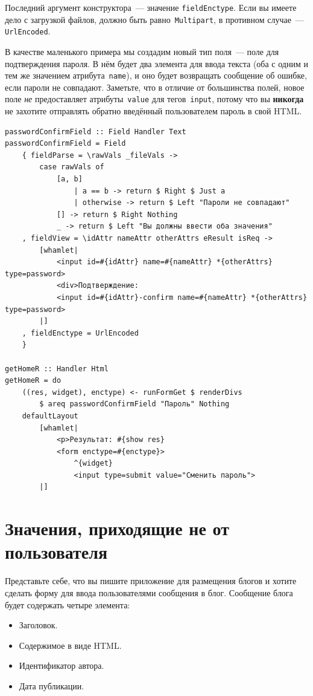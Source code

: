 Последний аргумент конструктора~--- значение \lstinline'fieldEnctype'. Если вы
имеете дело с загрузкой файлов, должно быть равно~\lstinline'Multipart', в
противном случае~--- \lstinline'UrlEncoded'.

В качестве маленького примера мы создадим новый тип поля~--- поле для
подтверждения пароля. В нём будет два элемента для ввода текста (оба с одним и
тем же значением атрибута~\texttt{name}), и оно будет возвращать сообщение об
ошибке, если пароли не совпадают. Заметьте, что в отличие от большинства
полей, новое поле \emph{не} предоставляет атрибуты~\texttt{value} для
тегов~\texttt{input}, потому что вы \textbf{никогда} не захотите отправлять
обратно введённый пользователем пароль в свой HTML.

\begin{lstlisting}
passwordConfirmField :: Field Handler Text
passwordConfirmField = Field
    { fieldParse = \rawVals _fileVals ->
        case rawVals of
            [a, b]
                | a == b -> return $ Right $ Just a
                | otherwise -> return $ Left "Пароли не совпадают"
            [] -> return $ Right Nothing
            _ -> return $ Left "Вы должны ввести оба значения"
    , fieldView = \idAttr nameAttr otherAttrs eResult isReq ->
        [whamlet|
            <input id=#{idAttr} name=#{nameAttr} *{otherAttrs} type=password>
            <div>Подтверждение:
            <input id=#{idAttr}-confirm name=#{nameAttr} *{otherAttrs} type=password>
        |]
    , fieldEnctype = UrlEncoded
    }

getHomeR :: Handler Html
getHomeR = do
    ((res, widget), enctype) <- runFormGet $ renderDivs
        $ areq passwordConfirmField "Пароль" Nothing
    defaultLayout
        [whamlet|
            <p>Результат: #{show res}
            <form enctype=#{enctype}>
                ^{widget}
                <input type=submit value="Сменить пароль">
        |]
\end{lstlisting}

\section{Значения, приходящие не от пользователя}
Представьте себе, что вы пишите приложение для размещения блогов и хотите
сделать форму для ввода пользователями сообщения в блог. Сообщение блога будет
содержать четыре элемента:
\begin{itemize}
    \item Заголовок.
    \item Содержимое в виде HTML.
    \item Идентификатор автора.
    \item Дата публикации.
\end{itemize}

